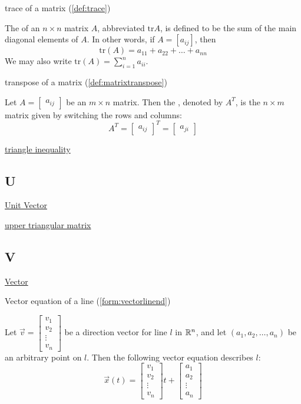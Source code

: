 \documentclass{ximera}
\begin{document}
trace of a matrix (\ref{def:trace})
\begin{expandable}
    The  of an $n \times n$ matrix $A$, abbreviated $\mbox{tr} A$, is defined to be the sum of the main diagonal elements of $A$.  In other words, if $ A = [a_{ij}]$, then $$\mbox{tr}(A) = a_{11} + a_{22} + \dots + a_{nn}$$  We may also write $\mbox{tr}(A) =\sum_{i=1}^n a_{ii}$.
\end{expandable}

transpose of a matrix (\ref{def:matrixtranspose})
\begin{expandable}
    Let $A=\begin{bmatrix} a _{ij}\end{bmatrix}$ be an $m\times n$ matrix. Then the , denoted by $A^{T}$, is the $n\times m$
matrix given by switching the rows and columns:
\begin{equation*}
A^{T} = \begin{bmatrix} a _{ij}\end{bmatrix}^{T}= \begin{bmatrix} a_{ji} \end{bmatrix}
\end{equation*}
\end{expandable}

\href{https://ximera.osu.edu/oerlinalg/LinearAlgebra/APX-0010/main}{triangle inequality}

\subsection*{U}
\href{https://ximera.osu.edu/oerlinalg/LinearAlgebra/VEC-0036/main}{Unit Vector}

\href{https://ximera.osu.edu/oerlinalg/LinearAlgebra/MAT-0070/main}{upper triangular matrix}

\subsection*{V}
\href{https://ximera.osu.edu/oerlinalg/LinearAlgebra/VEC-0010/main}{Vector}

Vector equation of a line (\ref{form:vectorlinend})
\begin{expandable}
    Let $\vec{v}=\begin{bmatrix}v_1\\v_2\\\vdots\\v_n\end{bmatrix}$ be a direction vector for line $l$ in $\mathbb{R}^n$, and let $(a_1, a_2,\ldots , a_n)$ be an arbitrary point on $l$.  Then the following vector equation describes $l$:
$$\vec{x}(t)=\begin{bmatrix}v_1\\v_2\\\vdots\\v_n\end{bmatrix}t+\begin{bmatrix}a_1\\a_2\\\vdots\\a_n\end{bmatrix}$$
\end{expandable}
\end{document}
